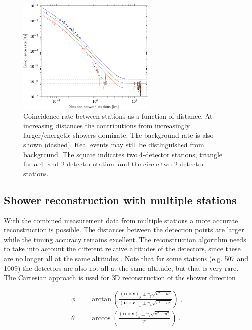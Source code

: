 \begin{figure}
    \centering
    \includegraphics[width=0.6\textwidth]
                    {plots/cluster/distance_v_coincidence_rate}
    \caption{Coincidence rate between stations as a function of distance. At increasing distances the contributions from increasingly larger/energetic showers dominate. The background rate is also shown (dashed). Real events may still be distinguished from background. The square indicates two 4-detector stations, triangle for a 4- and 2-detector station, and the circle two 2-detector stations.}
    \label{fig:distance_v_coincidence_rate}
\end{figure}


\subsection{Shower reconstruction with multiple stations}

With the combined measurement data from multiple stations a more accurate reconstruction is possible. The distances between the detection points are larger while the timing accuracy remains excellent. The reconstruction algorithm needs to take into account the different relative altitudes of the detectors, since these are no longer all at the same altitudes \cite{steijger2012direction}. Note that for some stations (e.g. 507 and 1009) the detectors are also not all at the same altitude, but that is very rare. The Cartesian approach is used for 3D reconstruction of the shower direction \cite{montanus2015direction}

\begin{equation}
    \label{eq:direction3dflat}
    \begin{split}
        \phi &= \arctan \left(\frac{(\mathbf{u} \times \mathbf{v})_y \pm v_y \sqrt{v^2-u^2}}{(\mathbf{u} \times \mathbf{v})_x \pm v_x \sqrt{v^2-u^2}}\right) \ , \\
        \theta & = \arccos \left( \frac{(\mathbf{u} \times \mathbf{v})_z \pm v_z \sqrt{v^2-u^2}}{v^2}\right) \ .
    \end{split}
\end{equation}

